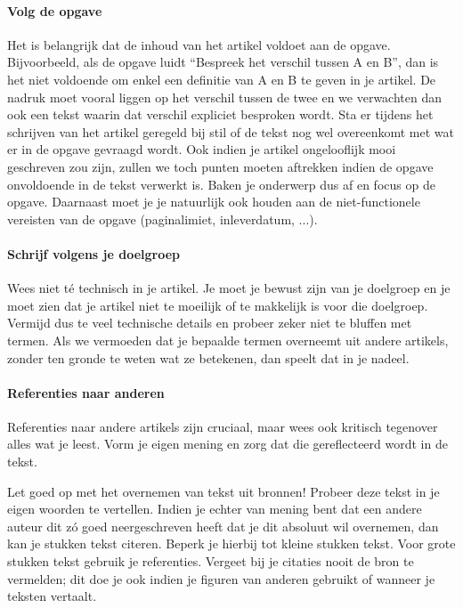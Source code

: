 \documentclass[a4paper]{article}
\begin{document}
\paragraph{Volg de opgave}

Het is belangrijk dat de inhoud van het artikel voldoet aan de opgave.
Bijvoorbeeld, als de opgave luidt ``Bespreek het verschil tussen A en B'', dan is het niet voldoende om enkel een definitie van A en B te geven in je artikel.
De nadruk moet vooral liggen op het verschil tussen de twee en we verwachten dan ook een tekst waarin dat verschil expliciet besproken wordt.
Sta er tijdens het schrijven van het artikel geregeld bij stil of de tekst nog wel overeenkomt met wat er in de opgave gevraagd wordt.
Ook indien je artikel ongelooflijk mooi geschreven zou zijn, zullen we toch punten moeten aftrekken indien de opgave onvoldoende in de tekst verwerkt is.
Baken je onderwerp dus af en focus op de opgave.
Daarnaast moet je je natuurlijk ook houden aan de niet-functionele vereisten van de opgave (paginalimiet, inleverdatum, ...).


\paragraph{Schrijf volgens je doelgroep}

Wees niet t\'e technisch in je artikel.
Je moet je bewust zijn van je doelgroep en je moet zien dat je artikel niet te moeilijk of te makkelijk is voor die doelgroep.
Vermijd dus te veel technische details en probeer zeker niet te bluffen met termen.
Als we vermoeden dat je bepaalde termen overneemt uit andere artikels, zonder ten gronde te weten wat ze betekenen, dan speelt dat in je nadeel.


\paragraph{Referenties naar anderen}

Referenties naar andere artikels zijn cruciaal, maar wees ook kritisch tegenover alles wat je leest.
Vorm je eigen mening en zorg dat die gereflecteerd wordt in de tekst.

Let goed op met het overnemen van tekst uit bronnen!
Probeer deze tekst in je eigen woorden te vertellen.
Indien je echter van mening bent dat een andere auteur dit z\'o goed neergeschreven heeft dat je dit absoluut wil overnemen, dan kan je stukken tekst citeren.
Beperk je hierbij tot kleine stukken tekst.
Voor grote stukken tekst gebruik je referenties.
Vergeet bij je citaties nooit de bron te vermelden; dit doe je ook indien je figuren van anderen gebruikt of wanneer je teksten vertaalt.



\end{document}
